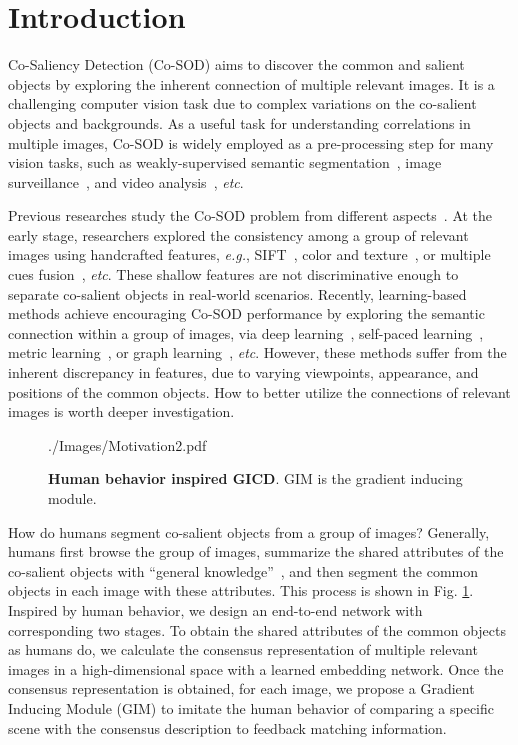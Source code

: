 \documentclass[runningheads,orivec]{llncs}
\newcommand{\figref}[1]{Fig. \ref{#1}}
\def\eg{\emph{e.g.}}
\def\etc{\emph{etc}}
\begin{document}
\section{Introduction}

Co-Saliency Detection (Co-SOD) aims to discover the common and salient objects 
by exploring the inherent connection of multiple relevant images.
It is a challenging computer vision task due to complex variations on the co-salient objects and backgrounds.
As a useful task for understanding correlations in multiple images, Co-SOD is widely employed as a pre-processing step for many vision tasks, such as weakly-supervised semantic segmentation~\cite{wei2016stc,zeng2019joint},
image surveillance~\cite{luo2015multi,gao2020trustful},
and video analysis~\cite{jerripothula2016cats,jerripothula2018efficient}, \etc.

Previous researches study the Co-SOD problem from different aspects~\cite{chen2010preattentive,li2019detecting,jiang2019unified}.
At the early stage, researchers explored the consistency among a group of relevant images using handcrafted features, \eg, SIFT~\cite{chang2011co,jerripothula2016cats}, color and texture~\cite{li2011co,fu2013cluster}, or multiple cues fusion~\cite{cao2014self}, \etc.
These shallow features are not discriminative enough to separate co-salient objects in real-world scenarios.
Recently, learning-based methods achieve encouraging Co-SOD performance by exploring the semantic connection within a group of images, 
via deep learning~\cite{wei2019deep,li2019detecting}, self-paced learning~\cite{zhang2016co,hsu2018unsupervised}, metric learning~\cite{han2017unified}, or graph learning~\cite{zheng2018feature,jiang2019unified}, \etc.
However, these methods suffer from the inherent discrepancy in features, due to varying viewpoints, appearance, and positions of the common objects.
How to better utilize the connections of relevant images is worth deeper investigation.
\begin{figure}[t]
	\centering
	\begin{overpic}[width=0.96\columnwidth]{./Images/Motivation2.pdf}
	\end{overpic}
	\caption{
		\textbf{Human behavior inspired GICD}.
GIM is the gradient inducing module.
	}
	\label{fig:human}
\end{figure}

How do humans segment co-salient objects from a group of images?
Generally, humans first browse the group of images, summarize the shared attributes of the co-salient objects with ``general
knowledge''~\cite{plaut2002graded}, and then segment the common objects in each image with these attributes.
This process is shown in \figref{fig:human}.
Inspired by human behavior, we design an end-to-end network with corresponding two stages.
To obtain the shared attributes of the common objects as humans do, we calculate the consensus representation of multiple relevant images in a high-dimensional space with a learned embedding network.
Once the consensus representation is obtained, 
for each image,
we propose a Gradient Inducing Module (GIM) to imitate the human behavior of comparing a specific scene with the consensus description to feedback matching information.
\end{document}
